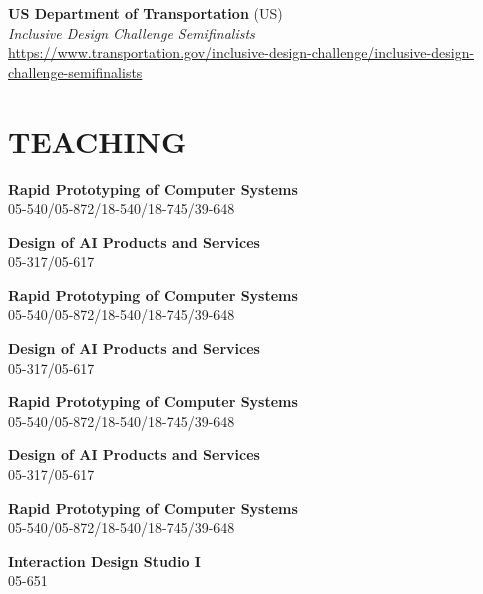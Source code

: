 \documentclass[11pt]{article} %
\begin{document}
 \textbf{US Department of Transportation} (US)\\
\textit{Inclusive Design Challenge Semifinalists}\\
\href{https://www.transportation.gov/inclusive-design-challenge/inclusive-design-challenge-semifinalists}{https://www.transportation.gov/inclusive-design-challenge/inclusive-design-challenge-semifinalists}


\section*{\uppercase{Teaching}}

 \textbf{Rapid Prototyping of Computer Systems}\\
05-540/05-872/18-540/18-745/39-648\\
\medskip

 \textbf{Design of AI Products and Services}\\
05-317/05-617\\
\medskip

 \textbf{Rapid Prototyping of Computer Systems}\\
05-540/05-872/18-540/18-745/39-648\\
\medskip

 \textbf{Design of AI Products and Services}\\
05-317/05-617\\
\medskip

 \textbf{Rapid Prototyping of Computer Systems}\\
05-540/05-872/18-540/18-745/39-648\\
\medskip

 \textbf{Design of AI Products and Services}\\
05-317/05-617\\
\medskip

 \textbf{Rapid Prototyping of Computer Systems}\\
05-540/05-872/18-540/18-745/39-648\\
\medskip

 \textbf{Interaction Design Studio I}\\
05-651
\medskip
\end{document}

